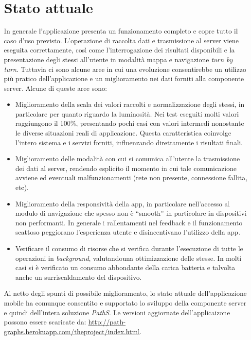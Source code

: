 \section{Stato attuale}
In generale l'applicazione presenta un funzionamento completo e copre tutto il caso d'uso previsto. L'operazione di raccolta dati e trasmissione al server viene eseguita correttamente, così come l'interrogazione dei risultati disponibili e la presentazione degli stessi all'utente in modalità mappa e navigazione \emph{turn by turn}.
Tuttavia ci sono alcune aree in cui una evoluzione consentirebbe un utilizzo più pratico dell'applicazione e un miglioramento nei dati forniti alla componente server. 
Alcune di queste aree sono:
\begin{itemize}
\item Miglioramento della scala dei valori raccolti e normalizzazione degli stessi, in particolare per quanto riguardo la luminosità. Nei test eseguiti molti valori raggiungono il 100\%, presentando pochi casi con valori intermedi nonostante le diverse situazioni reali di applicazione. Questa caratteristica coinvolge l'intero sistema e i servizi forniti, influenzando direttamente i risultati finali.
\item Miglioramento delle modalità con cui si comunica all'utente la trasmissione dei dati al server, rendendo esplicito il momento in cui tale comunicazione avviene ed eventuali malfunzionamenti (rete non presente, connessione fallita, etc).
\item Miglioramento della responsività della app, in particolare nell'accesso al modulo di navigazione che spesso non è ``smooth'' in particolare in dispositivi non performanti. In generale i rallentamenti nel feedback e il funzionamento scattoso peggiorano l'esperienza utente e disincentivano l'utilizzo della app.
\item Verificare il consumo di risorse che si verifica durante l'esecuzione di tutte le operazioni in \emph{background}, valutandouna ottimizzazione delle stesse. In molti casi si è verificato un consumo abbondante della carica batteria e talvolta anche un surriscaldamento del dispositivo.
\end{itemize}
Al netto degli spunti di possibile miglioramento, lo stato attuale dell'applicazione mobile ha comunque consentito e supportato lo sviluppo della componente server e quindi dell'intera soluzione \emph{PathS}. Le versioni aggiornate dell'applicaizone possono essere scaricate da: \url{http://path-graphs.herokuapp.com/theproject/index.html}.
